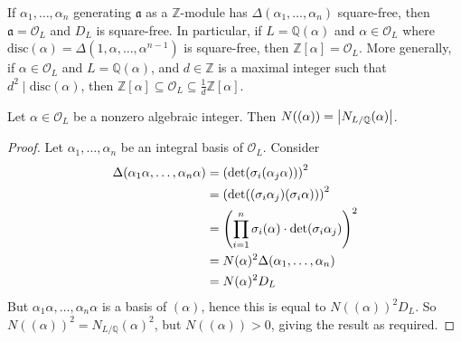 \begin{corollary}
    If \( \alpha_1, \dots, \alpha_n \) generating \( \mathfrak a \) as a \( \mathbb Z \)-module has \( \Delta(\alpha_1, \dots, \alpha_n) \) square-free, then \( \mathfrak a = \mathcal O_L \) and \( D_L \) is square-free.
    In particular, if \( L = \mathbb Q(\alpha) \) and \( \alpha \in \mathcal O_L \) where \( \mathrm{disc}(\alpha) = \Delta(1, \alpha, \dots, \alpha^{n-1}) \) is square-free, then \( \mathbb Z[\alpha] = \mathcal O_L \).
    More generally, if \( \alpha \in \mathcal O_L \) and \( L = \mathbb Q(\alpha) \), and \( d \in \mathbb Z \) is a maximal integer such that \( d^2 \mid \mathrm{disc}(\alpha) \), then \( \mathbb Z[\alpha] \subseteq \mathcal O_L \subseteq \frac{1}{d} \mathbb Z[\alpha] \).
\end{corollary}
\begin{lemma}
    Let \( \alpha \in \mathcal O_L \) be a nonzero algebraic integer.
    Then \( N((\alpha)) = \abs{N_{L/\mathbb Q}(\alpha)} \).
\end{lemma}
\begin{proof}
    Let \( \alpha_1, \dots, \alpha_n \) be an integral basis of \( \mathcal O_L \).
    Consider
    \begin{align*}
        \Delta(\alpha_1\alpha, \dots, \alpha_n\alpha) &= \qty(\det(\sigma_i (\alpha_j \alpha)))^2 \\
        &= \qty(\det((\sigma_i \alpha_j)(\sigma_i \alpha)))^2 \\
        &= \qty(\prod_{i=1}^n \sigma_i(\alpha) \cdot \det (\sigma_i \alpha_j))^2 \\
        &= N(\alpha)^2 \Delta(\alpha_1, \dots, \alpha_n) \\
        &= N(\alpha)^2 D_L
    \end{align*}
    But \( \alpha_1\alpha, \dots, \alpha_n\alpha \) is a basis of \( (\alpha) \), hence this is equal to \( N((\alpha))^2 D_L \).
    So \( N((\alpha))^2 = N_{L/\mathbb Q}(\alpha)^2 \), but \( N((\alpha)) > 0 \), giving the result as required.
\end{proof}

